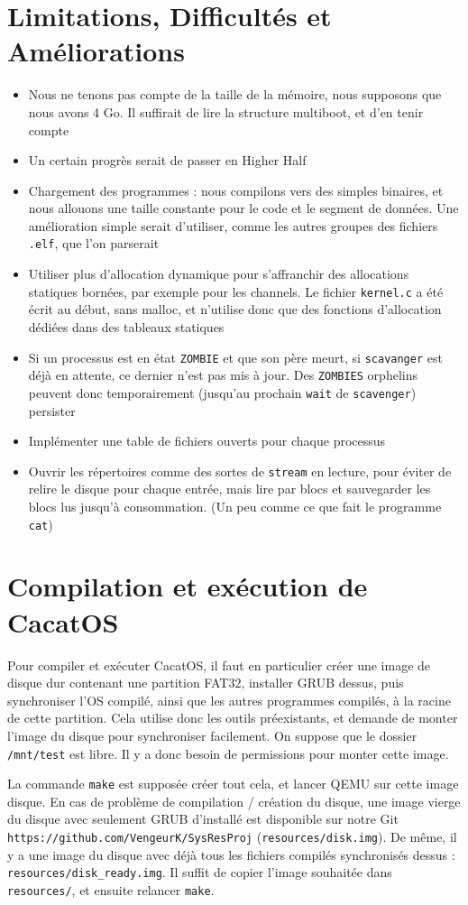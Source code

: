 \documentclass[a4paper,10pt, french]{article}
\newcommand{\code}[1]{\texttt{#1}}
\begin{document}
\section{Limitations, Difficultés et Améliorations}
\begin{itemize}
 \item Nous ne tenons pas compte de la taille de la mémoire, nous supposons que nous avons 4 Go.
 Il suffirait de lire la structure multiboot, et d'en tenir compte
 \item Un certain progrès serait de passer en Higher Half
 \item Chargement des programmes : nous compilons vers des simples binaires, et nous allouons une 
 taille constante pour le code et le segment de données. Une amélioration simple serait
 d'utiliser, comme les autres groupes des fichiers \code{.elf}, que l'on parserait
 \item Utiliser plus d'allocation dynamique pour s'affranchir des allocations statiques bornées, par exemple pour les channels. Le fichier
 \code{kernel.c} a été écrit au début, sans malloc, et n'utilise donc que des fonctions d'allocation dédiées dans des tableaux statiques
 \item Si un processus est en état \code{ZOMBIE} et que son père meurt, si \code{scavanger} est 
 déjà en attente, ce dernier n'est pas mis à jour. Des \code{ZOMBIES} orphelins peuvent donc temporairement (jusqu'au prochain \code{wait} de \code{scavenger}) persister
 \item Implémenter une table de fichiers ouverts pour chaque processus
 \item Ouvrir les répertoires comme des sortes de \code{stream} en lecture, pour éviter de relire le disque pour chaque
 entrée, mais lire par blocs et sauvegarder les blocs lus jusqu'à consommation. (Un peu comme ce que fait le
 programme \code{cat})
\end{itemize}

\section{Compilation et exécution de CacatOS}
Pour compiler et exécuter CacatOS, il faut en particulier créer une image de disque dur contenant une partition FAT32,
installer GRUB dessus, puis synchroniser l'OS compilé, ainsi que les autres programmes compilés, à la racine de
cette partition.
Cela utilise donc les outils préexistants, et demande de monter l'image du disque pour synchroniser facilement.
On suppose que le dossier \code{/mnt/test} est libre.
Il y a donc besoin de permissions pour monter cette image.

La commande \code{make} est supposée créer tout cela, et lancer QEMU sur cette image disque.
En cas de problème de compilation / création du disque, une image vierge du disque avec seulement GRUB d'installé
est disponible sur notre Git \code{https://github.com/VengeurK/SysResProj} (\code{resources/disk.img}). De même, il y a une image du disque avec déjà tous les fichiers compilés
synchronisés dessus : \code{resources/disk\_ready.img}.
Il suffit de copier l'image souhaitée dans \code{resources/}, et ensuite relancer \code{make}.
\end{document}
